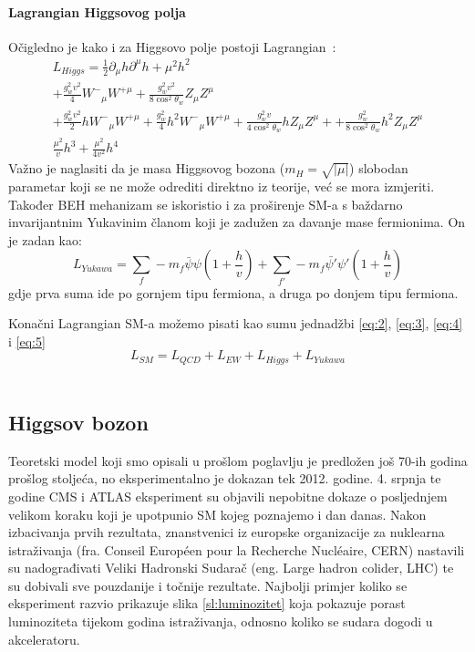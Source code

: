 \documentclass[12pt,a4paper,oneside]{article}
\begin{document}
\begin{linenumbers}
		\paragraph{Lagrangian Higgsovog polja\newline}
		Očigledno je kako i za Higgsovo polje postoji Lagrangian~\cite{doktorat}:
		\begin{equation}\label{eq:4}
		\begin{split}
		L_{Higgs} = \frac{1}{2} \partial_\mu h \partial^\mu h + \mu^2 h^2 \\ + \frac{g_w^2 v^2}{4} {W^-}_\mu {W^{+\mu}} + \frac{g^2_w v^2}{8 \cos^2 \theta_w} Z_\mu Z^\mu \\ + \frac{g^2_w v^2}{2} h {W^-}_\mu {W^{+\mu}} + \frac{g^2_w }{4} h^2 {W^-}_\mu {W^{+\mu}} + \frac{g^2_w v}{4 \cos^2 \theta_w} h {Z}_\mu {Z^{\mu}} + + \frac{g^2_w}{8 \cos^2 \theta_w} h^2 {Z}_\mu {Z^{\mu}} \\ \frac{\mu^2}{v} h^3 + \frac{\mu^2}{4v^2} h^4
		\end{split}
		\end{equation}
		Važno je naglasiti da je masa Higgsovog bozona (\begin{math}
		m_H = \sqrt{|\mu|}
		\end{math})  slobodan parametar koji se ne može odrediti direktno iz teorije, već se mora izmjeriti.
		Također BEH mehanizam se iskoristio i za proširenje SM-a s baždarno invarijantnim Yukavinim članom koji je zadužen za davanje mase fermionima. On je zadan kao:
		\begin{equation}\label{eq:5}
			L_{Yukawa} = \sum_{f} -m_f \bar{\psi} \psi (1 + \frac{h}{v}) + \sum_{f'} -m_f \bar{\psi'} \psi' (1 + \frac{h}{v})
		\end{equation} 
		gdje prva suma ide po gornjem tipu fermiona, a druga po donjem tipu fermiona.
		
		Konačni Lagrangian SM-a možemo pisati kao sumu jednadžbi \ref{eq:2}, \ref{eq:3}, \ref{eq:4} i \ref{eq:5} 
		\begin{equation}
			L_{SM} = L_{QCD} + L_{EW} + L_{Higgs} + L_{Yukawa}
		\end{equation}
		~\cite{doktorat}
		
		\subsection{Higgsov bozon}
		Teoretski model koji smo opisali u prošlom poglavlju  je predložen još 70-ih godina prošlog stoljeća, no eksperimentalno je dokazan tek 2012. godine. 4. srpnja te godine CMS i ATLAS eksperiment su  objavili nepobitne dokaze o posljednjem velikom koraku koji je upotpunio SM kojeg poznajemo i dan danas. Nakon izbacivanja prvih  rezultata, znanstvenici iz europske organizacije za nuklearna istraživanja (fra. Conseil Européen pour la Recherche Nucléaire, CERN)  nastavili su nadograđivati Veliki Hadronski Sudarač (eng. Large hadron colider, LHC) te su dobivali sve pouzdanije i točnije rezultate. Najbolji primjer koliko se eksperiment razvio prikazuje slika \ref{sl:luminozitet}  koja pokazuje  porast luminoziteta  tijekom godina istraživanja, odnosno koliko se sudara dogodi u akceleratoru.~\cite{doktorat}
		

\end{linenumbers}
\end{document}
